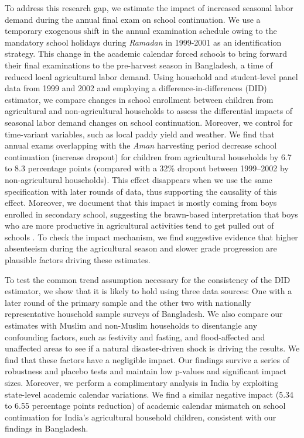 \documentclass[12pt,letterpaper]{article}
\newcommand{\0}{\ensuremath{\mbox{\boldmath $0$}}}
\begin{document}
To address this research gap, we estimate the impact of increased seasonal labor demand during the annual final exam on school continuation. We use a temporary exogenous shift in the annual examination schedule owing to the mandatory school holidays during \textit{Ramadan} in 1999-2001 as an identification strategy. This change in the academic calendar forced schools to bring forward their final examinations to the pre-harvest season in Bangladesh, a time of reduced local agricultural labor demand. Using household and student-level panel data from 1999 and 2002 and employing a difference-in-differences (DID) estimator, we compare changes in school enrollment between children from agricultural and non-agricultural households to assess the differential impacts of seasonal labor demand changes on school continuation. Moreover, we control for time-variant variables, such as local paddy yield and weather. We find that annual exams overlapping with the \textit{Aman} harvesting period decrease school continuation (increase dropout) for children from agricultural households by 6.7 to 8.3 percentage points (compared with a 32\% dropout between 1999–2002 by non-agricultural households). This effect disappears when we use the same specification with later rounds of data, thus supporting the causality of this effect. Moreover, we document that this impact is mostly coming from boys enrolled in secondary school, suggesting the brawn-based interpretation that boys who are more productive in agricultural activities tend to get pulled out of schools \citep{PittRosenzweigHassan2010}. To check the impact mechanism, we find suggestive evidence that higher absenteeism during the agricultural season and slower grade progression are plausible factors driving these estimates.    

To test the common trend assumption necessary for the consistency of the DID estimator, we show that it is likely to hold using three data sources: One with a later round of the primary sample and the other two with nationally representative household sample surveys of Bangladesh. We also compare our estimates with Muslim and non-Muslim households to disentangle any confounding factors, such as festivity and fasting, and flood-affected and unaffected areas to see if a natural disaster-driven shock is driving the results. We find that these factors have a negligible impact. Our findings survive a series of robustness and placebo tests and maintain low p-values and significant impact sizes. Moreover, we perform a complimentary analysis in India by exploiting state-level academic calendar variations. We find a similar negative impact (5.34 to 6.55 percentage points reduction) of academic calendar mismatch on school continuation for India’s agricultural household children, consistent with our findings in Bangladesh.
\end{document}
